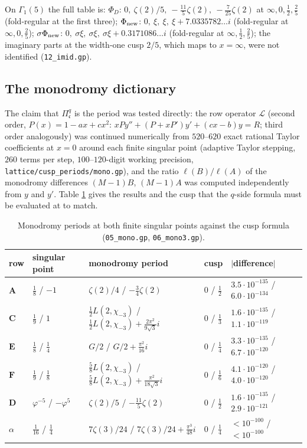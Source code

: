 \documentclass[11pt]{amsart}
\theoremstyle{definition}
\theoremstyle{remark}
\newcommand{\cc}{\mathfrak c}\newcommand{\Pc}{\Pi_{\cc}}\newcommand{\Pq}{\Pi^{q}}
\newcommand{\Phinew}{\Phi_{\rm new}}\newcommand{\Phican}{\Phi_{\rm can}}
\begin{document}
On $\Gamma_1(5)$ the full table is: $\Phi_D$: $0,\ \zeta(2)/5,\ -\tfrac{11}5\zeta(2),\ -\tfrac7{25}\zeta(2)$ at $\infty,0,\tfrac12,\tfrac25$ (fold-regular at the first three); $\Phinew$: $0,\ \xi,\ \xi,\ \xi+7.0335782\ldots i$ (fold-regular at $\infty,0,\tfrac25$); $\sigma\Phinew$: $0,\ \sigma\xi,\ \sigma\xi,\ \sigma\xi+0.3171086\ldots i$ (fold-regular at $\infty,\tfrac12,\tfrac25$); the imaginary parts at the width-one cusp $2/5$, which maps to $x=\infty$, were not identified (\texttt{12\_imid.gp}).

\subsection{The monodromy dictionary}
The claim that $\Pq_{\cc}$ is the period was tested directly: the row operator $\mathcal L$ (second order, $P(x)=1-ax+cx^2$: $xPy''+(P+xP')y'+(cx-b)y=R$; third order analogously) was continued numerically from $520$--$620$ exact rational Taylor coefficients at $x=0$ around each finite singular point (adaptive Taylor stepping, $260$ terms per step, $100$--$120$-digit working precision, \texttt{lattice/cusp\_periods/mono.gp}), and the ratio $\ell(B)/\ell(A)$ of the monodromy differences $(M-1)B$, $(M-1)A$ was computed independently from $y$ and $y'$. Table \ref{tab:mono} gives the results and the cusp that the $q$-side formula must be evaluated at to match.

\begin{table}[ht]
\caption{Monodromy periods at both finite singular points against the cusp formula (\texttt{05\_mono.gp}, \texttt{06\_mono3.gp}).}\label{tab:mono}
\small\renewcommand{\arraystretch}{1.15}
\begin{tabular}{@{}lllll@{}}\toprule
row & singular point & monodromy period & cusp & $|$difference$|$\\\midrule
$\mathbf A$ & $\tfrac18$ / $-1$ & $\zeta(2)/4$ / $-\tfrac34\zeta(2)$ & $0$ / $\tfrac12$ & $3.5\cdot10^{-135}$ / $6.0\cdot10^{-134}$\\
$\mathbf C$ & $\tfrac19$ / $1$ & $\tfrac12L(2,\chi_{-3})$ / $\tfrac12L(2,\chi_{-3})+\tfrac{2\pi^2}{9\sqrt3}i$ & $0$ / $\tfrac13$ & $1.6\cdot10^{-135}$ / $1.1\cdot10^{-119}$\\
$\mathbf E$ & $\tfrac18$ / $\tfrac14$ & $G/2$ / $G/2+\tfrac{\pi^2}{16}i$ & $0$ / $\tfrac14$ & $3.3\cdot10^{-135}$ / $6.7\cdot10^{-120}$\\
$\mathbf F$ & $\tfrac19$ / $\tfrac18$ & $\tfrac58L(2,\chi_{-3})$ / $\tfrac58L(2,\chi_{-3})+\tfrac{\pi^2}{18\sqrt3}i$ & $0$ / $\tfrac16$ & $4.1\cdot10^{-120}$ / $4.0\cdot10^{-120}$\\
$\mathbf D$ & $\varphi^{-5}$ / $-\varphi^5$ & $\zeta(2)/5$ / $-\tfrac{11}5\zeta(2)$ & $0$ / $\tfrac12$ & $1.6\cdot10^{-135}$ / $2.9\cdot10^{-121}$\\
$\alpha$ & $\tfrac1{16}$ / $\tfrac14$ & $7\zeta(3)/24$ / $7\zeta(3)/24+\tfrac{\pi^3}{48}i$ & $0$ / $\tfrac14$ & $<10^{-100}$ / $<10^{-100}$\\
\bottomrule
\end{tabular}
\end{table}
\end{document}
